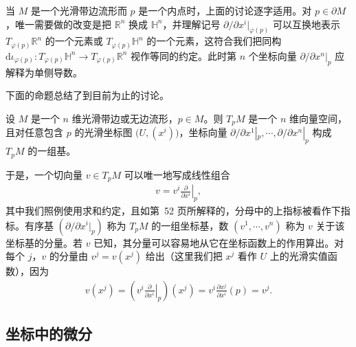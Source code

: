 \documentclass[../../main.tex]{subfiles}
\begin{document}
当 $M$ 是一个光滑带边流形而 $p$ 是一个内点时，上面的讨论逐字适用。对 $p\in\partial M$，唯一需要做的改变是把 $\mathbb{R}^{n}$ 换成 $\mathbb{H}^{n}$，并理解记号 $\partial/\partial x^{i}|_{\varphi(p)}$ 可以互换地表示 $T_{\varphi(p)}\mathbb{R}^{n}$ 的一个元素或 $T_{\varphi(p)}\mathbb{H}^{n}$ 的一个元素，这符合我们把同构 $\mathrm{d}\iota_{\varphi(p)}:T_{\varphi(p)}\mathbb{H}^{n}\to T_{\varphi(p)}\mathbb{R}^{n}$ 视作等同的约定。此时第 $n$ 个坐标向量 $\partial/\partial x^{n}|_{p}$ 应解释为单侧导数。

下面的命题总结了到目前为止的讨论。

\begin{proposition}\label{proposition:ch03-坐标向量基}
设 $M$ 是一个 $n$ 维光滑带边或无边流形，$p\in M$。则 $T_{p}M$ 是一个 $n$ 维向量空间，且对任意包含 $p$ 的光滑坐标图 $\bigl(U,(x^{i})\bigr)$，坐标向量 $\partial/\partial x^{1}|_{p},\cdots ,\partial/\partial x^{n}|_{p}$ 构成 $T_{p}M$ 的一组基。
\end{proposition}

于是，一个切向量 $v\in T_{p}M$ 可以唯一地写成线性组合
\begin{align*}
v=v^{i}\left.\frac{\partial}{\partial x^{i}}\right|_{p},
\end{align*}
其中我们照例使用求和约定，且如第~52 页所解释的，分母中的上指标被看作下指标。有序基 $(\partial/\partial x^{i}|_{p})$ 称为 $T_{p}M$ 的一组坐标基，数 $(v^{1},\cdots ,v^{n})$ 称为 $v$ 关于该坐标基的分量。若 $v$ 已知，其分量可以容易地从它在坐标函数上的作用算出。对每个 $j$，$v$ 的分量由 $v^{j}=v(x^{j})$ 给出（这里我们把 $x^{j}$ 看作 $U$ 上的光滑实值函数），因为
\begin{align*}
v(x^{j})=\left(v^{i}\left.\frac{\partial}{\partial x^{i}}\right|_{p}\right)(x^{j})
=v^{i}\frac{\partial x^{j}}{\partial x^{i}}(p)=v^{j}.
\end{align*}

\subsection{坐标中的微分}\label{subsection:ch03-坐标中的微分}
\end{document}
